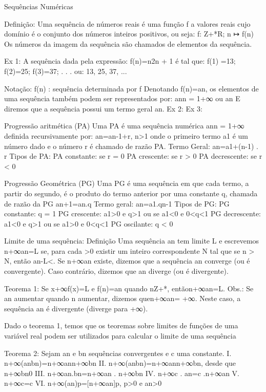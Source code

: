 Sequências Numéricas

Definição: 
    Uma sequência de números reais é uma função f a valores reais cujo domínio é o conjunto dos números inteiros positivos, ou seja: f: Z+*R; n ↦ f(n) 
    Os números da imagem da sequência são chamados de elementos da sequência. 

Ex 1:
    A sequência dada pela expressão: 
        f(n)=n2n + 1
    é tal que:
        f(1) =13; f(2)=25; f(3)=37; . . . 
    ou:
        13, 25, 37, ...

Notação:
    {f(n)} : sequência determinada por f
    Denotando f(n)=an, os elementos de uma sequência também podem ser representados por:
        {an}n = 1+∞ ou {an}
    E diremos que a sequência possui um termo geral an.
    Ex 2:
    Ex 3:

Progressão aritmética (PA)
    Uma PA é uma sequência numérica {an}n = 1+∞ definida recursivamente por:
        an=an-1+r, n>1
    onde o primeiro termo a1 é um número dado e o número r é chamado de razão PA.
    Termo Geral:
        an=a1+(n-1) . r
    Tipos de PA:
PA constante: se r = 0
PA crescente: se r > 0
PA decrescente: se r < 0

Progressão Geométrica (PG)
    Uma PG é uma sequência em que cada termo, a partir do segundo, é o produto do termo anterior por uma constante q, chamada de razão da PG
        an+1=an.q
    Termo geral:
        an=a1.qn-1
    Tipos de PG:
PG constante: q = 1
PG crescente: a1>0 e q>1 ou se a1<0 e 0<q<1
PG decrescente: a1<0 e q>1 ou se a1>0 e 0<q<1
PG oscilante: q < 0

Limite de uma sequência:
    Definição
        Uma sequência {an} tem limite L e escrevemos n+∞an=L se, para cada >0 existir um inteiro correspondente N tal que se n > N, então an-L<.
        Se n+∞an existe, dizemos que a sequência {an} converge (ou é convergente). Caso contrário, dizemos que {an} diverge (ou é divergente).

    Teorema 1:
        Se x+∞f(x)=L e f(n)=an quando nZ+*, entãon+∞an=L. 
        Obs.: Se an aumentar quando n aumentar, dizemos quen+∞an= +∞. Neste caso, a sequência {an} é divergente (diverge para +∞).

    Dado o teorema 1, temos que os teoremas sobre limites de funções de uma variável real podem ser utilizados para calcular o limite de uma sequência 

    Teorema 2:
        Sejam {an} e {bn} sequências convergentes e c uma constante.
        I. n+∞(anbn)=n+∞ann+∞bn
        II. n+∞(anbn)=n+∞ann+∞bn, desde que n+∞bn0
        III. n+∞an.bn=n+∞an . n+∞bn
        IV. n+∞c . an=c .n+∞an
        V. n+∞c=c
        VI. n+∞(an)p=[n+∞an]p, p>0 e an>0

